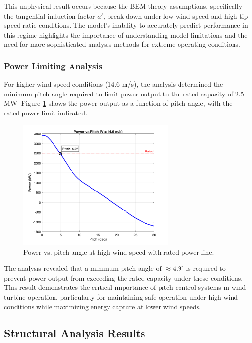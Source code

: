 \documentclass[11pt]{article}
\begin{document}
This unphysical result occurs because the BEM theory assumptions, specifically the tangential induction factor $a'$, break down under low wind speed and high tip speed ratio conditions. The model's inability to accurately predict performance in this regime highlights the importance of understanding model limitations and the need for more sophisticated analysis methods for extreme operating conditions.
\subsubsection{Power Limiting Analysis}

For higher wind speed conditions (14.6 m/s), the analysis determined the minimum pitch angle required to limit power output to the rated capacity of 2.5 MW. Figure \ref{fig:power_vs_pitch} shows the power output as a function of pitch angle, with the rated power limit indicated.

\begin{figure}[H]
  \centering
  \includegraphics[width=0.7\textwidth]{../../PNGS/Deliverable4_Power_vs_Pitch.png}
  \caption{Power vs. pitch angle at high wind speed with rated power line.}
  \label{fig:power_vs_pitch}
\end{figure}

The analysis revealed that a minimum pitch angle of $\approx 4.9^{\circ}$ is required to prevent power output from exceeding the rated capacity under these conditions.
This result demonstrates the critical importance of pitch control systems in wind turbine operation, particularly for maintaining safe operation under high wind conditions while maximizing energy capture at lower wind speeds. 

\subsection{Structural Analysis Results}
\end{document}

